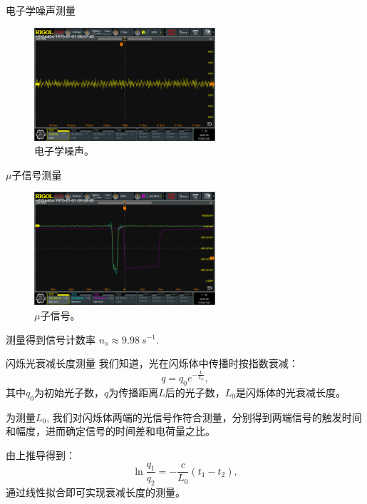 \documentclass[10pt]{beamer}
\begin{document}
\begin{frame}[label={sec:org7d2cd88}]{电子学噪声测量}
\begin{figure}[htbp]
\centering
\includegraphics[width=0.6\textwidth]{../ExperimentData/figs/elenoise0.png}
\caption{电子学噪声。}
\end{figure}
\end{frame}
\begin{frame}[label={sec:org9e0e478}]{\(\mu\)子信号测量}
\begin{figure}[htbp]
\centering
\includegraphics[width=0.6\textwidth]{../ExperimentData/figs/musignal0.png}
\caption{\(\mu\)子信号。}
\end{figure}

测量得到信号计数率 \(n_s \approx \qty{9.98}{s^{-1}}\).
\end{frame}
\begin{frame}[label={sec:org830efa8}]{闪烁光衰减长度测量}
我们知道，光在闪烁体中传播时按指数衰减：
\begin{equation}
\label{eq:1}
q = q_0 e^{-\frac{L}{L_0}},
\end{equation}
其中\(q_0\)为初始光子数，\(q\)为传播距离\(L\)后的光子数，\(L_0\)是闪烁体的光衰减长度。

为测量\(L_0\), 我们对闪烁体两端的光信号作符合测量，分别得到两端信号的触发时间和幅度，进而确定信号的时间差和电荷量之比。

由上推导得到：
\begin{equation}
\label{eq:2}
\ln \frac{q_1}{q_2} = -\frac{c}{L_0}(t_1 - t_2),
\end{equation}
通过线性拟合即可实现衰减长度的测量。
\end{frame}
\end{document}
